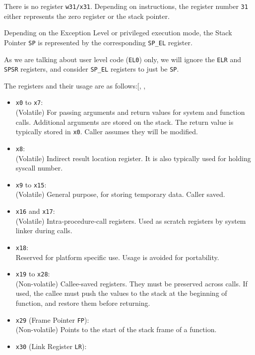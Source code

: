 \documentclass[a4paper, nobind]{templates/ociamthesis}
\providecommand{\tightlist}{%
  \setlength{\itemsep}{0pt}\setlength{\parskip}{0pt}}
\begin{document}
There is no register \texttt{w31/x31}. Depending on instructions, the register number \texttt{31}
either represents the zero register or the stack pointer.

Depending on the Exception Level or privileged execution mode,
the Stack Pointer \texttt{SP} is represented by the corresponding \texttt{SP\_EL} register.

As we are talking about user level code (\texttt{EL0}) only, we will ignore the \texttt{ELR} and \texttt{SPSR}
registers, and consider \texttt{SP\_EL} registers to just be \texttt{SP}.

The registers and their usage are as follows:{[}, , \citeproc{ref-arm-pcs}{8}{]}

\begin{itemize}
\tightlist
\item
  \texttt{x0} to \texttt{x7}:\\
  (Volatile) For passing arguments and return values for system and function calls.
  Additional arguments are stored on the stack.
  The return value is typically stored in \texttt{x0}. Caller assumes they will be modified.
\item
  \texttt{x8}:\\
  (Volatile) Indirect result location register. It is also typically used for holding
  syscall number.
\item
  \texttt{x9} to \texttt{x15}:\\
  (Volatile) General purpose, for storing temporary data. Caller saved.
\item
  \texttt{x16} and \texttt{x17}:\\
  (Volatile) Intra-procedure-call registers. Used as scratch
  registers by system linker during calls.
\item
  \texttt{x18}:\\
  Reserved for platform specific use. Usage is avoided for portability.
\item
  \texttt{x19} to \texttt{x28}:\\
  (Non-volatile) Callee-saved registers. They must be preserved across calls.
  If used, the callee must push the values to the stack at the beginning of function,
  and restore them before returning.
\item
  \texttt{x29} (Frame Pointer \texttt{FP}):\\
  (Non-volatile) Points to the start of the stack frame of a function.
\item
  \texttt{x30} (Link Register \texttt{LR}):\\

\end{itemize}
\end{document}
